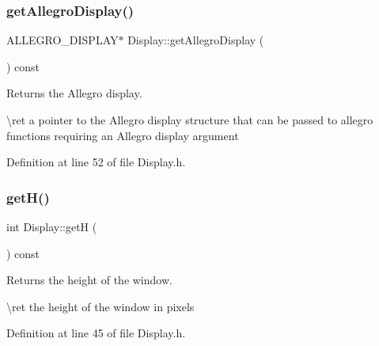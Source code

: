 \subsubsection{\texorpdfstring{getAllegroDisplay()}{getAllegroDisplay()}}
{\footnotesize\ttfamily A\+L\+L\+E\+G\+R\+O\+\_\+\+D\+I\+S\+P\+L\+AY$\ast$ Display\+::get\+Allegro\+Display (\begin{DoxyParamCaption}{ }\end{DoxyParamCaption}) const\hspace{0.3cm}{\ttfamily [inline]}}



Returns the Allegro display. 

\textbackslash{}ret a pointer to the Allegro display structure that can be passed to allegro functions requiring an Allegro display argument 

Definition at line 52 of file Display.\+h.


\begin{DoxyCode}{0}

\end{DoxyCode}
\mbox{\label{class_display_a5faae23c211bed34aca048b98e2b9e81}} 
\subsubsection{\texorpdfstring{getH()}{getH()}}
{\footnotesize\ttfamily int Display\+::getH (\begin{DoxyParamCaption}{ }\end{DoxyParamCaption}) const\hspace{0.3cm}{\ttfamily [inline]}}



Returns the height of the window. 

\textbackslash{}ret the height of the window in pixels 

Definition at line 45 of file Display.\+h.


\begin{DoxyCode}{0}

\end{DoxyCode}
\mbox{\label{class_display_a246593e6e7d4e634e9c638525e103b6e}} 

